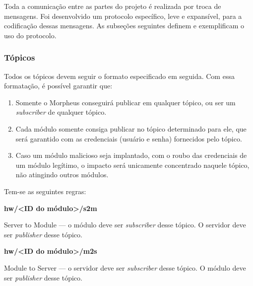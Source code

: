Toda a comunicação entre as partes do projeto é realizada por troca de mensagens. Foi desenvolvido um protocolo específico, leve e expansível, para a codificação dessas mensagens. As subseções seguintes definem e exemplificam o uso do protocolo.

\subsubsection{Tópicos}
Todos os tópicos devem seguir o formato especificado em seguida. Com essa formatação, é possível garantir que:

\begin{enumerate}
\item Somente o Morpheus conseguirá publicar em qualquer tópico, ou ser um \emph{subscriber} de qualquer tópico.
\item Cada módulo somente consiga publicar no tópico determinado para ele, que será garantido com as credenciais (usuário e senha) fornecidos pelo tópico.
\item Caso um módulo malicioso seja implantado, com o roubo das credenciais de um módulo legítimo, o impacto será unicamente concentrado naquele tópico, não atingindo outros módulos.
\end{enumerate}

Tem-se as seguintes regras:

\textbf{hw/\textless ID do módulo\textgreater /s2m}

Server to Module --- o módulo deve ser \emph{subscriber} desse tópico. O servidor deve ser \emph{publisher} desse tópico.

\textbf{hw/\textless ID do módulo\textgreater /m2s}

Module to Server --- o servidor deve ser \emph{subscriber} desse tópico. O módulo deve ser \emph{publisher} desse tópico.

